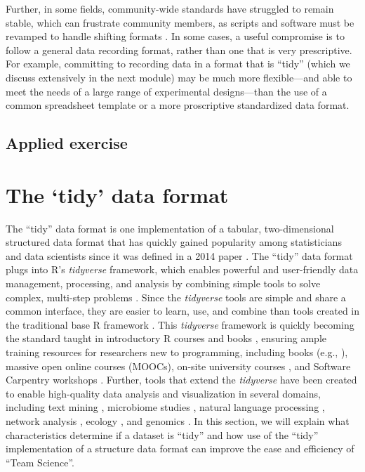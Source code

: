 \documentclass[]{tufte-book}
\begin{document}
Further, in some fields, community-wide standards have struggled to remain
stable, which can frustrate community members, as scripts and software must be
revamped to handle shifting formats \citep{buffalo2015bioinformatics, barga2011bioinformatics}. In some cases, a useful compromise is to follow a
general data recording format, rather than one that is very prescriptive. For
example, committing to recording data in a format that is ``tidy'' (which we
discuss extensively in the next module) may be much more flexible---and able to
meet the needs of a large range of experimental designs---than the use of a
common spreadsheet template or a more proscriptive standardized data format.

\hypertarget{applied-exercise}{%
\subsection{Applied exercise}\label{applied-exercise}}

\hypertarget{the-tidy-data-format}{%
\section{The `tidy' data format}\label{the-tidy-data-format}}

The ``tidy'' data format is one implementation of a tabular, two-dimensional
structured data format that has quickly gained popularity among statisticians
and data scientists since it was defined in a 2014 paper \citep{wickham2014tidy}.
The ``tidy'' data format plugs into R's \emph{tidyverse} framework, which enables
powerful and user-friendly data management, processing, and analysis by
combining simple tools to solve complex, multi-step problems
\citep{ross2017declutter, silge2016tidytext, wickham2016ggplot2, wickham2016r}.
Since the \emph{tidyverse} tools are simple and share a common interface, they are
easier to learn, use, and combine than tools created in the traditional base R
framework \citep{ross2017declutter, lowndes2017our, reviewer2017review, mcnamara2016state}. This \emph{tidyverse} framework is quickly becoming the standard
taught in introductory R courses and books \citep{hicks2017guide, baumer2015data, kaplan2018teaching, stander2017enthusing, reviewer2017review, mcnamara2016state}, ensuring ample training resources for researchers new to
programming, including books (e.g., \citep{baumer2017modern, lifesciencesR, wickham2016r}), massive open online courses (MOOCs), on-site university courses
\citep{baumer2015data, kaplan2018teaching, stander2017enthusing}, and Software
Carpentry workshops \citep{wilson2014software, pawlik2017developing}. Further, tools
that extend the \emph{tidyverse} have been created to enable high-quality data
analysis and visualization in several domains, including text mining
\citep{silge2017text}, microbiome studies \citep{mcmurdie2013phyloseq}, natural language
processing \citep{RJ-2017-035}, network analysis \citep{RJ-2017-023}, ecology
\citep{hsieh2016inext}, and genomics \citep{yin2012ggbio}. In this section, we will
explain what characteristics determine if a dataset is ``tidy'' and how use of the
``tidy'' implementation of a structure data format can improve the ease and
efficiency of ``Team Science''.
\end{document}
